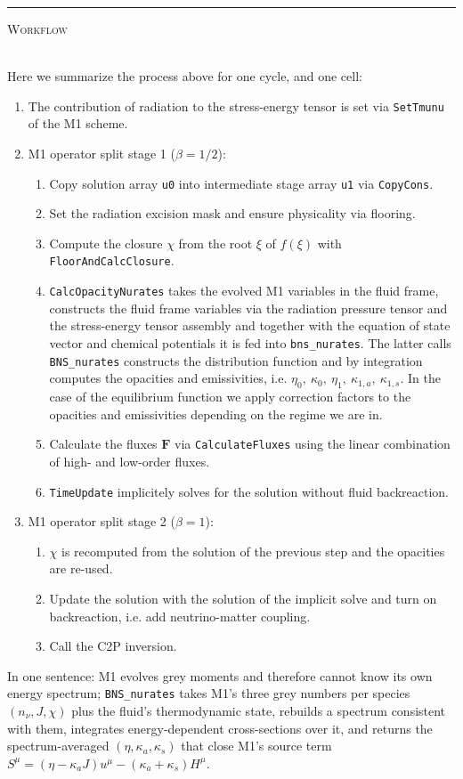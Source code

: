 \documentclass{article}
\newcommand{\var}[1]{%
  {\setlength{\fboxsep}{1.5pt}%
   \colorbox{varbg}{\textcolor{varfg}{\texttt{\small #1}}}}}
\newcommand{\step}[1]{%
  \par\medskip\noindent
  {\color{stepfg}\rule[-0.15ex]{2pt}{1.5ex}\hspace{0.5em}\scshape #1}%
  \hspace{0.75em}\ignorespaces}
\begin{document}
\step{Workflow}\mbox{}\\
Here we summarize the process above for one cycle, and one cell:
\begin{enumerate}
  \item The contribution of radiation to the stress-energy tensor is set via \var{SetTmunu} of the M1 scheme.
  \item M1 operator split stage 1 ($\beta=1/2$):
  \begin{enumerate}
    \item Copy solution array \var{u0} into intermediate stage array \var{u1} via \var{CopyCons}.
    \item Set the radiation excision mask and ensure physicality via flooring.
    \item Compute the closure $\chi$ from the root $\xi$ of $f(\xi)$ with \var{FloorAndCalcClosure}.
    \item \var{CalcOpacityNurates} takes the evolved M1 variables in the fluid frame, constructs the fluid frame variables via the radiation pressure tensor and
    the stress-energy tensor assembly and together with the equation of state vector and chemical potentials it is fed into \var{bns\_nurates}. The latter calls \texttt{BNS\_nurates} constructs
    the distribution function and by integration computes the opacities and emissivities, i.e. $\eta_0,\ \kappa_0,\ \eta_1,\ \kappa_{1,a},\ \kappa_{1,s}$. In the case of the
    equilibrium function we apply correction factors to the opacities and emissivities depending on the regime we are in.
    \item Calculate the fluxes $\mathbf{F}$ via \var{CalculateFluxes} using the linear combination of high- and low-order fluxes.
    \item \var{TimeUpdate} implicitely solves for the solution without fluid backreaction.
  \end{enumerate}
  \item M1 operator split stage 2 ($\beta=1$):
  \begin{enumerate}
    \item $\chi$ is recomputed from the solution of the previous step and the opacities are re-used.
    \item Update the solution with the solution of the implicit solve and turn on backreaction, i.e. add neutrino-matter coupling.
    \item Call the C2P inversion.
  \end{enumerate}
\end{enumerate}
In one sentence: M1 evolves grey moments and therefore cannot know its own energy spectrum; \texttt{BNS\_nurates} takes M1's three grey numbers per
species $(n_{\nu},J,\chi)$ plus the fluid's thermodynamic state, rebuilds a spectrum consistent with them, integrates energy-dependent cross-sections over it, and
returns the spectrum-averaged $(\eta,\kappa_a,\kappa_s)$ that close M1's source term $S^{\mu}=(\eta-\kappa_aJ)u^{\mu}-(\kappa_a+\kappa_s)H^{\mu}$.



\end{document}
